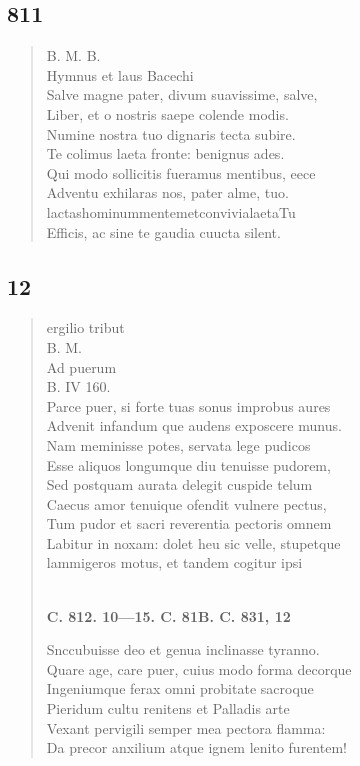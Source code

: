 \documentclass[11pt, a4paper]{report}
\begin{document}
            \subsection*{811}
      \begin{verse}
      B. M. B. \\ Hymnus et laus Bacechi \\ Salve magne pater, divum suavissime, salve, \\ Liber, et o nostris saepe colende modis. \\ Numine nostra tuo dignaris tecta subire. \\ Te colimus laeta fronte: benignus ades. \\ Qui modo sollicitis fueramus mentibus, eece \\ Adventu exhilaras nos, pater alme, tuo. \\ lactashominummentemetconvivialaetaTu \\ Efficis, ac sine te gaudia cuucta silent. \\ 
      \end{verse}
  
            \subsection*{12}
      \begin{verse}
      ergilio tribut \\ B. M. \\ Ad puerum \\ B. IV 160. \\ Parce puer, si forte tuas sonus improbus aures \\ Advenit infandum \lbrack que \rbrack  audens exposcere munus. \\ Nam meminisse potes, servata lege pudicos \\ Esse aliquos longumque diu tenuisse pudorem, \\ Sed postquam aurata delegit cuspide telum \\ Caecus amor tenuique ofendit vulnere pectus, \\ Tum pudor et sacri reverentia pectoris omnem \\ Labitur in noxam: dolet heu sic velle, stupetque \\ lammigeros motus, et tandem cogitur ipsi \\ 
        ﻿\pagebreak 
     \marginpar{[300]} \begin{center} \textbf{C. 812. 10—15. C. 81B. C. 831, 12} \end{center}Snccubuisse deo et genua inclinasse tyranno. \\ Quare age, care puer, cuius modo forma decorque \\ Ingeniumque ferax omni probitate sacroque \\ Pieridum cultu renitens et Palladis arte \\ Vexant pervigili semper mea pectora flamma: \\ Da precor anxilium atque ignem lenito furentem! \\ 
      \end{verse}
  
\end{document}

